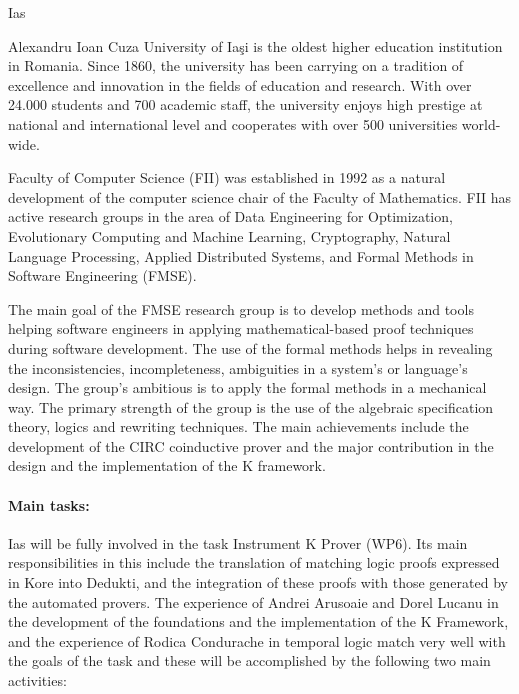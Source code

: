 \begin{sitedescription}{Ias}



Alexandru Ioan Cuza University of Iaşi is the oldest higher education institution in Romania. 
Since 1860, the university has been carrying on a tradition of excellence and innovation in 
the fields of education and research. With over 24.000 students and 700 academic staff, 
the university enjoys high prestige at national and international level and cooperates with  
over 500 universities world-wide. 

Faculty of Computer Science (FII) was established in 1992 as a natural development of the computer 
science chair of the Faculty of Mathematics. FII has active research groups in the area of 
Data Engineering for Optimization, Evolutionary Computing and Machine Learning, Cryptography,
Natural Language Processing, Applied Distributed Systems, and Formal Methods in Software Engineering (FMSE).

The main goal of the FMSE research group is to develop methods and tools helping software
engineers in applying mathematical-based proof techniques during software development.
The use of the formal methods helps in revealing the inconsistencies, incompleteness,
ambiguities in a system's or language's design. The group’s ambitious is to apply the formal
methods in a mechanical way. The primary strength of the group is the use of the algebraic
specification theory, logics and rewriting techniques. The main achievements include the
development of the CIRC coinductive prover and the major contribution in the design and the
implementation of the K framework.

\paragraph*{Main tasks:}

Ias will be fully involved in the task Instrument K Prover (WP6). Its main responsibilities in this 
include the translation of matching logic proofs expressed in Kore into Dedukti, and the integration
of these proofs with those generated by the automated provers. The experience of Andrei Arusoaie and 
Dorel Lucanu in the development of the foundations and the implementation of the K Framework, and
the experience of Rodica Condurache in temporal logic match very well with the goals of the task and
 these will be  accomplished by the following two main activities:


\end{sitedescription}
